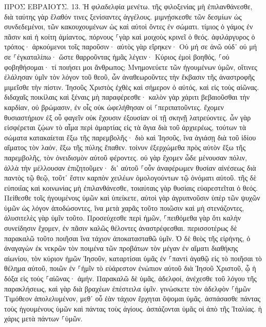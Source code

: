 \documentclass[twoside, 9pt]{extreport}
\begin{document}
ΠΡΟΣ ΕΒΡΑΙΟΥΣ.
13.
Ἡ φιλαδελφία μενέτω. 
τῆς φιλοξενίας μὴ ἐπιλανθάνεσθε, διὰ ταύτης γὰρ ἔλαθόν τινες ξενίσαντες ἀγγέλους. 
μιμνῄσκεσθε τῶν δεσμίων ὡς συνδεδεμένοι, τῶν κακουχουμένων ὡς καὶ αὐτοὶ ὄντες ἐν σώματι. 
τίμιος ὁ γάμος ἐν πᾶσιν καὶ ἡ κοίτη ἀμίαντος, πόρνους ⸀γὰρ καὶ μοιχοὺς κρινεῖ ὁ θεός. 
ἀφιλάργυρος ὁ τρόπος· ἀρκούμενοι τοῖς παροῦσιν· αὐτὸς γὰρ εἴρηκεν· Οὐ μή σε ἀνῶ οὐδ᾽ οὐ μή σε ⸀ἐγκαταλίπω· 
ὥστε θαρροῦντας ἡμᾶς λέγειν· Κύριος ἐμοὶ βοηθός, ⸀οὐ φοβηθήσομαι· τί ποιήσει μοι ἄνθρωπος; 
Μνημονεύετε τῶν ἡγουμένων ὑμῶν, οἵτινες ἐλάλησαν ὑμῖν τὸν λόγον τοῦ θεοῦ, ὧν ἀναθεωροῦντες τὴν ἔκβασιν τῆς ἀναστροφῆς μιμεῖσθε τὴν πίστιν. 
Ἰησοῦς Χριστὸς ἐχθὲς καὶ σήμερον ὁ αὐτός, καὶ εἰς τοὺς αἰῶνας. 
διδαχαῖς ποικίλαις καὶ ξέναις μὴ παραφέρεσθε· καλὸν γὰρ χάριτι βεβαιοῦσθαι τὴν καρδίαν, οὐ βρώμασιν, ἐν οἷς οὐκ ὠφελήθησαν οἱ ⸀περιπατοῦντες. 
ἔχομεν θυσιαστήριον ἐξ οὗ φαγεῖν οὐκ ἔχουσιν ἐξουσίαν οἱ τῇ σκηνῇ λατρεύοντες. 
ὧν γὰρ εἰσφέρεται ζῴων τὸ αἷμα περὶ ἁμαρτίας εἰς τὰ ἅγια διὰ τοῦ ἀρχιερέως, τούτων τὰ σώματα κατακαίεται ἔξω τῆς παρεμβολῆς· 
διὸ καὶ Ἰησοῦς, ἵνα ἁγιάσῃ διὰ τοῦ ἰδίου αἵματος τὸν λαόν, ἔξω τῆς πύλης ἔπαθεν. 
τοίνυν ἐξερχώμεθα πρὸς αὐτὸν ἔξω τῆς παρεμβολῆς, τὸν ὀνειδισμὸν αὐτοῦ φέροντες. 
οὐ γὰρ ἔχομεν ὧδε μένουσαν πόλιν, ἀλλὰ τὴν μέλλουσαν ἐπιζητοῦμεν· 
δι᾽ αὐτοῦ ⸀οὖν ἀναφέρωμεν θυσίαν αἰνέσεως διὰ παντὸς τῷ θεῷ, τοῦτ᾽ ἔστιν καρπὸν χειλέων ὁμολογούντων τῷ ὀνόματι αὐτοῦ. 
τῆς δὲ εὐποιΐας καὶ κοινωνίας μὴ ἐπιλανθάνεσθε, τοιαύταις γὰρ θυσίαις εὐαρεστεῖται ὁ θεός. 
Πείθεσθε τοῖς ἡγουμένοις ὑμῶν καὶ ὑπείκετε, αὐτοὶ γὰρ ἀγρυπνοῦσιν ὑπὲρ τῶν ψυχῶν ὑμῶν ὡς λόγον ἀποδώσοντες, ἵνα μετὰ χαρᾶς τοῦτο ποιῶσιν καὶ μὴ στενάζοντες, ἀλυσιτελὲς γὰρ ὑμῖν τοῦτο. 
Προσεύχεσθε περὶ ἡμῶν, ⸀πειθόμεθα γὰρ ὅτι καλὴν συνείδησιν ἔχομεν, ἐν πᾶσιν καλῶς θέλοντες ἀναστρέφεσθαι. 
περισσοτέρως δὲ παρακαλῶ τοῦτο ποιῆσαι ἵνα τάχιον ἀποκατασταθῶ ὑμῖν. 
Ὁ δὲ θεὸς τῆς εἰρήνης, ὁ ἀναγαγὼν ἐκ νεκρῶν τὸν ποιμένα τῶν προβάτων τὸν μέγαν ἐν αἵματι διαθήκης αἰωνίου, τὸν κύριον ἡμῶν Ἰησοῦν, 
καταρτίσαι ὑμᾶς ἐν ⸀παντὶ ἀγαθῷ εἰς τὸ ποιῆσαι τὸ θέλημα αὐτοῦ, ποιῶν ἐν ⸀ἡμῖν τὸ εὐάρεστον ἐνώπιον αὐτοῦ διὰ Ἰησοῦ Χριστοῦ, ᾧ ἡ δόξα εἰς τοὺς ⸀αἰῶνας· ἀμήν. 
Παρακαλῶ δὲ ὑμᾶς, ἀδελφοί, ἀνέχεσθε τοῦ λόγου τῆς παρακλήσεως, καὶ γὰρ διὰ βραχέων ἐπέστειλα ὑμῖν. 
γινώσκετε τὸν ἀδελφὸν ⸀ἡμῶν Τιμόθεον ἀπολελυμένον, μεθ᾽ οὗ ἐὰν τάχιον ἔρχηται ὄψομαι ὑμᾶς. 
ἀσπάσασθε πάντας τοὺς ἡγουμένους ὑμῶν καὶ πάντας τοὺς ἁγίους. ἀσπάζονται ὑμᾶς οἱ ἀπὸ τῆς Ἰταλίας. 
ἡ χάρις μετὰ πάντων ⸀ὑμῶν. 
\end{document}
